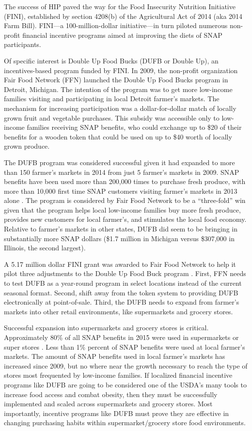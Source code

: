 \documentclass[12pt,letterpaperpaper,]{book}
\begin{document}
The success of HIP paved the way for the Food Insecurity Nutrition
Initiative (FINI), established by section 4208(b) of the Agricultural
Act of 2014 (aka 2014 Farm Bill). FINI---a 100-million-dollar
initiative---in turn piloted numerous non-profit financial incentive
programs aimed at improving the diets of SNAP participants.

Of specific interest is Double Up Food Bucks (DUFB or Double Up), an
incentives-based program funded by FINI. In 2009, the non-profit
organization Fair Food Network (FFN) launched the Double Up Food Bucks
program in Detroit, Michigan. The intention of the program was to get
more low-income families visiting and participating in local Detroit
farmer's markets. The mechanism for increasing participation was a
dollar-for-dollar match of locally grown fruit and vegetable purchases.
This subsidy was accessible only to low-income families receiving SNAP
benefits, who could exchange up to \$20 of their benefits for a wooden
token that could be used on up to \$40 worth of locally grown produce.

The DUFB program was considered successful given it had expanded to more
than 150 farmer's markets in 2014 from just 5 farmer's markets in 2009.
SNAP benefits have been used more than 200,000 times to purchase fresh
produce, with more than 10,000 first time SNAP customers visiting
farmer's markets in 2013 alone \citep{fair_food_network_double_2014}.
The program is considered by Fair Food Network to be a ``three-fold''
win given that the program helps local low-income families buy more
fresh produce, provides new customers for local farmer's, and stimulates
the local food economy. Relative to farmer's markets in other states,
DUFB did seem to be bringing in substantially more SNAP dollars (\$1.7
million in Michigan versus \$307,000 in Illinois, the second largest).

A 5.17 million dollar FINI grant was awarded to Fair Food Network to
help it pilot three adjustments to the Double Up Food Buck program
\citep{usda_nifa_usda_2015}. First, FFN needs to test DUFB as a
year-round program in select locations instead of the current seasonal
format. Second, shift away from the token system to providing DUFB
electronically at point-of-sale. Third, the DUFB needs to expand from
farmer's markets into other retail environments, like supermarkets and
grocery stores.

Successful expansion into supermarkets and grocery stores is critical.
Approximately 80\% of all SNAP benefits in 2015 were used in
supermarkets or super stores \citep{usda_fns_snap_2016}. Less than 1\%
percent of SNAP benefits were used at local farmer's markets. The amount
of SNAP benefits used in local farmer's markets has increased since
2009, but no where near the growth necessary to reach the type of stores
most frequented by low-income families. If localized financial incentive
programs like DUFB are going to be considered one of the USDA's many
tools to increase food access and combat obesity, then they must be
successfully implemented and scaled across supermarkets and grocery
stores. Most importantly, incentive programs like DUFB must prove they
are effective in changing purchasing habits within supermarket/grocery
store food environments.
\end{document}
